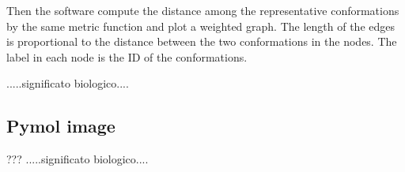 Then the software compute the distance among the representative conformations by the same metric function and plot a weighted graph.
The length of the edges is proportional to the distance between the two conformations in the nodes. The label in each node is the ID of the conformations.


.....significato biologico.... 


\subsection{Pymol image}
???
.....significato biologico.... 